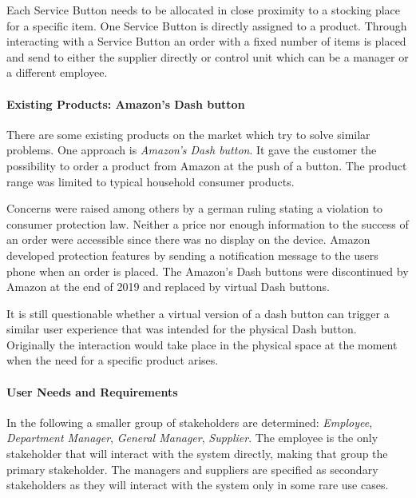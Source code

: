 Each Service Button needs to be allocated in close proximity to a stocking place for a specific item. One Service Button is directly assigned to a product. Through interacting with a Service Button an order with a fixed number of items is placed and send to either the supplier directly or control unit which can be a manager or a different employee.

\paragraph{Existing Products: Amazon's Dash button}

There are some existing products on the market which try to solve similar problems. One approach is \textit{Amazon's Dash button}. It gave the customer the possibility to order a product from Amazon at the push of a button. The product range was limited to typical household consumer products. 

Concerns were raised among others by a german ruling stating a violation to consumer protection law. Neither a price nor enough information to the success of an order were accessible since there was no display on the device. Amazon developed protection features by sending a notification message to the users phone when an order is placed. The Amazon's Dash buttons were discontinued by Amazon at the end of 2019 and replaced by virtual Dash buttons. \cite{Online:TheVerge:DashbuttonCourt, Online:TheVerge:DashbuttonDiscontinued}

It is still questionable whether a virtual version of a dash button can trigger a similar user experience that was intended for the physical Dash button. Originally the interaction would take place in the physical space at the moment when the need for a specific product arises.

\paragraph{User Needs and Requirements}

In the following a smaller group of stakeholders are determined: \textit{Employee}, \textit{Department Manager}, \textit{General Manager}, \textit{Supplier}. The employee is the only stakeholder that will interact with the system directly, making that group the primary stakeholder. The managers and suppliers are specified as secondary stakeholders as they will interact with the system only in some rare use cases.

